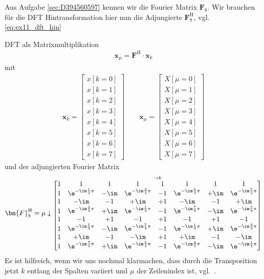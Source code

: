 \begin{Werkzeug}
Aus Aufgabe \ref{sec:D394560597} kennen wir die Fourier Matrix $\bm{F}_8$.
Wir brauchen für die DFT Hintransformation hier nun die Adjungierte $\bm{F}^\mathrm{H}_8$,
vgl. \eqref{eq:ex11_dft_hin}
\end{Werkzeug}
\begin{Ansatz}
DFT als Matrixmultiplikation
\begin{align}
\bm{x}_\mu = \bm{F}^\mathrm{H} \cdot \bm{x}_k
\end{align}
mit
\begin{align}
%
\bm{x}_k =
\begin{bmatrix}
x[k=0]\\x[k=1]\\x[k=2]\\x[k=3]\\x[k=4]\\x[k=5]\\x[k=6]\\x[k=7]
\end{bmatrix}
%
\qquad
%
\bm{x}_\mu =
\begin{bmatrix}
X[\mu=0]\\X[\mu=1]\\X[\mu=2]\\X[\mu=3]\\X[\mu=4]\\X[\mu=5]\\X[\mu=6]\\X[\mu=7]
\end{bmatrix}
%
\end{align}
und der adjungierten Fourier Matrix
\begin{align}
\bm{F}^\mathrm{H}_8 =
\mu \downarrow
\substack{\rightarrow k\\
\begin{bmatrix}
1 & 1 & 1 & 1 & 1 & 1 & 1 & 1\\
1 & \e^{-\im\frac{1}{4}\pi} & -\im & \e^{-\im\frac{3}{4}\pi} & -1 & \e^{-\im\frac{5}{4}\pi} & +\im & \e^{-\im\frac{7}{4}\pi}\\
1 & -\im & -1 & +\im & +1 & -\im & -1 & +\im\\
1 & \e^{-\im\frac{3}{4}\pi} & +\im & \e^{-\im\frac{1}{4}\pi} & -1 & \e^{-\im\frac{7}{4}\pi} & -\im & \e^{-\im\frac{5}{4}\pi}\\
1 & -1 & +1 & -1 & +1 & -1 & +1 & -1\\
1 & \e^{-\im\frac{5}{4}\pi} & -\im & \e^{-\im\frac{7}{4}\pi} & -1 & \e^{-\im\frac{1}{4}\pi} & +\im & \e^{-\im\frac{3}{4}\pi}\\
1 & +\im & -1 & -\im & +1 & +\im & -1 & -\im\\
1 & \e^{-\im\frac{7}{4}\pi} & +\im & \e^{-\im\frac{5}{4}\pi} & -1 & \e^{-\im\frac{3}{4}\pi} & -\im & \e^{-\im\frac{1}{4}\pi}\\
\end{bmatrix}
}
%
\end{align}
Es ist hilfreich, wenn wir uns nochmal klarmachen, dass durch die Transposition
jetzt $k$ entlang der Spalten variiert und $\mu$ der Zeilenindex ist,
vgl.~.
\end{Ansatz}
%

